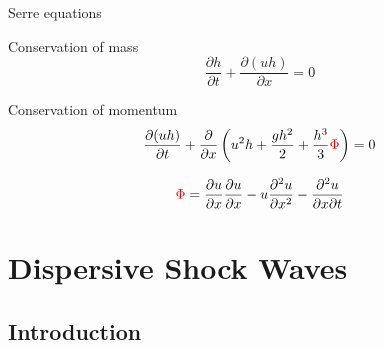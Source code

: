\documentclass[pdf]{beamer}
\begin{document}
\begin{frame}{Serre equations}
	
	Conservation of mass
	\[
	\dfrac{\partial h}{\partial t} + \dfrac{\partial (uh)}{\partial x} = 0
	\]
	
	Conservation of momentum
	\begin{equation*}
	\dfrac{\partial (uh)}{\partial t} + \dfrac{\partial}{\partial x} \left ( u^2h + \dfrac{gh^2}{2} + \dfrac{h^3}{3}{\color{red} \Phi }   \right )  = 0
	\end{equation*}
	
	\[ 	{\color{red} \Phi }  = \dfrac{\partial u }{\partial x} \dfrac{\partial u}{\partial x} -u \dfrac{\partial^2 u}{\partial x^2}  - \dfrac{\partial^2 u}{\partial x \partial t}  \]
\end{frame}



\section{Dispersive Shock Waves}
\subsection{Introduction}
\end{document}
